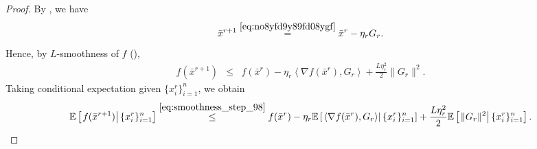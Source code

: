 \documentclass[10pt,a4paper]{amsart}
\newcommand{\ExpCond}[2]{{\mathbb{E}}\left[\left.#1\right\vert#2\right]}
\newcommand{\anglebr}[1]{\left\langle#1\right\rangle} %
\newcommand{\inner}[2]{\anglebr{#1, #2}}
\begin{document}
\begin{proof}
By , we have
\begin{equation*}
\bar x^{r+1}
\overset{\eqref{eq:no8yfd9y89fd08ygf}}{=}
\bar x^r-\eta_r G_r.
\end{equation*}
Hence, by \(L\)-smoothness of \(f\) (),
\begin{eqnarray}
f(\bar x^{r+1})
&\le&
f(\bar x^r)
-
\eta_r \inner{\nabla f(\bar x^r)}{G_r}
+
\frac{L\eta_r^2}{2}\|G_r\|^2.
\label{eq:smoothness_step_98}
\end{eqnarray}
Taking conditional expectation given \(\{x_i^r\}_{i=1}^n\), we obtain
\begin{eqnarray}
\ExpCond{ f(\bar x^{r+1}) }{ \{x_i^r\}_{i=1}^n }
\overset{\eqref{eq:smoothness_step_98}}{\leq}
f(\bar x^r)
-
\eta_r \ExpCond{ \inner{\nabla f(\bar x^r)}{G_r} }{ \{x_i^r\}_{i=1}^n }
+
\frac{L\eta_r^2}{2}\ExpCond{ \|G_r\|^2 }{ \{x_i^r\}_{i=1}^n }.
\label{eq:start_one_round_descent_0980fd}
\end{eqnarray}


\end{proof}
\end{document}
